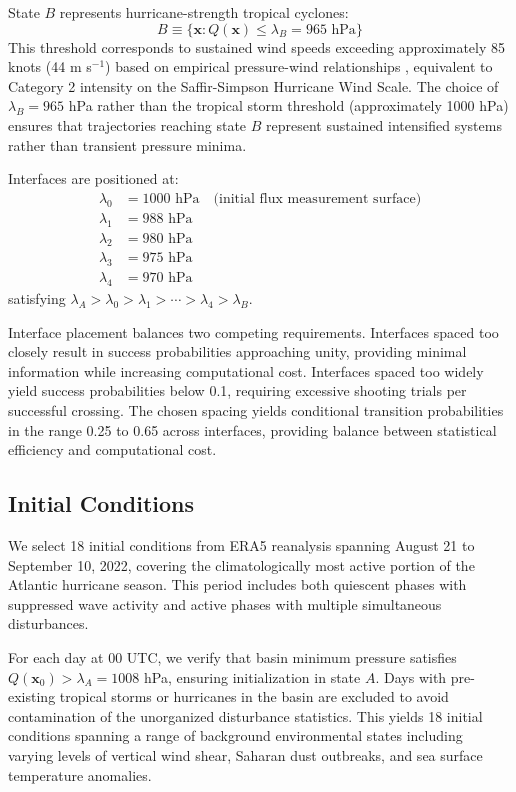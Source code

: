 \documentclass[11pt]{article}
\begin{document}
State $B$ represents hurricane-strength tropical cyclones:
\begin{equation}
B \equiv \{\mathbf{x} : Q(\mathbf{x}) \leq \lambda_B = 965 \text{ hPa}\}
\end{equation}
This threshold corresponds to sustained wind speeds exceeding approximately 85 knots (44 m s$^{-1}$) based on empirical pressure-wind relationships \citep{knaff2007improved}, equivalent to Category 2 intensity on the Saffir-Simpson Hurricane Wind Scale. The choice of $\lambda_B = 965$ hPa rather than the tropical storm threshold (approximately 1000 hPa) ensures that trajectories reaching state $B$ represent sustained intensified systems rather than transient pressure minima.

Interfaces are positioned at:
\begin{align}
\lambda_0 &= 1000 \text{ hPa} \quad \text{(initial flux measurement surface)} \\
\lambda_1 &= 988 \text{ hPa} \\
\lambda_2 &= 980 \text{ hPa} \\
\lambda_3 &= 975 \text{ hPa} \\
\lambda_4 &= 970 \text{ hPa}
\end{align}
satisfying $\lambda_A > \lambda_0 > \lambda_1 > \cdots > \lambda_4 > \lambda_B$.

Interface placement balances two competing requirements. Interfaces spaced too closely result in success probabilities approaching unity, providing minimal information while increasing computational cost. Interfaces spaced too widely yield success probabilities below 0.1, requiring excessive shooting trials per successful crossing. The chosen spacing yields conditional transition probabilities in the range 0.25 to 0.65 across interfaces, providing balance between statistical efficiency and computational cost.

\subsection{Initial Conditions}

We select 18 initial conditions from ERA5 reanalysis spanning August 21 to September 10, 2022, covering the climatologically most active portion of the Atlantic hurricane season. This period includes both quiescent phases with suppressed wave activity and active phases with multiple simultaneous disturbances.

For each day at 00 UTC, we verify that basin minimum pressure satisfies $Q(\mathbf{x}_0) > \lambda_A = 1008$ hPa, ensuring initialization in state $A$. Days with pre-existing tropical storms or hurricanes in the basin are excluded to avoid contamination of the unorganized disturbance statistics. This yields 18 initial conditions spanning a range of background environmental states including varying levels of vertical wind shear, Saharan dust outbreaks, and sea surface temperature anomalies.
\end{document}
